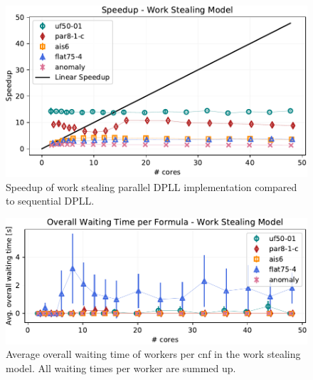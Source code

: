\documentclass[letterpaper]{article}
\begin{document}
\begin{figure}[p]
    \centering
    \includegraphics[width=\columnwidth]{figures/scaling_stealing_subset_dpll_scaling_tar.pdf}
    \caption{Speedup of work stealing parallel DPLL implementation compared to sequential DPLL.
    \label{fig:dpll_stealing_speedup}}
\end{figure}
\begin{figure}[p]
	\centering
	\includegraphics[width=\columnwidth]{figures/waiting_stealing_subset_dpll_scaling_tar.pdf}
	\caption{Average overall waiting time of workers per cnf in the work stealing model.
		All waiting times per worker are summed up.}
	\label{fig:dpll_stealing_waiting}
\end{figure}
\end{document}
